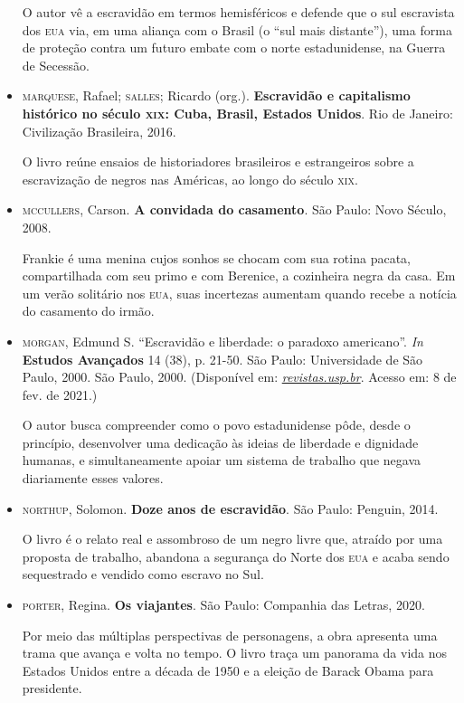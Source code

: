 \documentclass[11pt]{extarticle}
\begin{document}
\begin{itemize}
O autor vê a escravidão em termos hemisféricos e defende que o sul
escravista dos \textsc{eua} via, em uma aliança com o Brasil (o ``sul mais
distante''), uma forma de proteção contra um futuro embate com o norte
estadunidense, na Guerra de Secessão.

\item\textsc{marquese}, Rafael; \textsc{salles}; Ricardo (org.). \textbf{Escravidão e
  capitalismo histórico no século \textsc{xix}: Cuba, Brasil, Estados Unidos}.
  Rio de Janeiro: Civilização Brasileira, 2016.

O livro reúne ensaios de historiadores brasileiros e estrangeiros sobre
a escravização de negros nas Américas, ao longo do século \textsc{xix}.

\item\textsc{mccullers}, Carson. \textbf{A convidada do casamento}. São Paulo: Novo
  Século, 2008.

Frankie é uma menina cujos sonhos se chocam com sua rotina pacata,
compartilhada com seu primo e com Berenice, a cozinheira negra da casa.
Em um verão solitário nos \textsc{eua}, suas incertezas aumentam quando recebe a
notícia do casamento do irmão.

\item\textsc{morgan}, Edmund S. ``Escravidão e liberdade: o paradoxo americano''.
  \emph{In} \textbf{Estudos Avançados} 14 (38), p. 21-50. São Paulo:
  Universidade de São Paulo, 2000. São Paulo, 2000. (Disponível em:
  \href{http://www.revistas.usp.br/eav/article/view/9507}{\emph{revistas.usp.br}}.
  Acesso em: 8 de fev. de 2021.)

O autor busca compreender como o povo estadunidense pôde, desde o
princípio, desenvolver uma dedicação às ideias de liberdade e dignidade
humanas, e simultaneamente apoiar um sistema de trabalho que negava
diariamente esses valores.

\item\textsc{northup}, Solomon. \textbf{Doze anos de escravidão}. São Paulo:
  Penguin, 2014.

O livro é o relato real e assombroso de um negro livre que, atraído por
uma proposta de trabalho, abandona a segurança do Norte dos \textsc{eua} e acaba
sendo sequestrado e vendido como escravo no Sul.

\item\textsc{porter}, Regina. \textbf{Os viajantes}. São Paulo: Companhia das
  Letras, 2020.

Por meio das múltiplas perspectivas de personagens, a obra apresenta uma
trama que avança e volta no tempo. O livro traça um panorama da vida nos
Estados Unidos entre a década de 1950 e a eleição de Barack Obama para
presidente.


\end{itemize}
\end{document}
